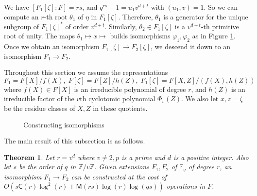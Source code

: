\documentclass[12pt]{article}
\theoremstyle{plain}
\newtheorem{theorem}{Theorem}
\theoremstyle{definition}
\def\Z{\ensuremath{\mathbb{Z}}}
\def\F{\ensuremath{\mathbb{F}}}
\def\MM{\ensuremath{\mathsf{M}}}
\def\CC{\ensuremath{\mathsf{C}}}
\begin{document}
We have $[F_1[\zeta]: F] = rs$, and $q^{rs} - 1 = u_1v^{d + t}$ with $(u_1, v) = 1$. So we can 
compute an $r$-th root $\theta_1$ of $\eta$ in $F_1[\zeta]$. Therefore, $\theta_1$ is a generator 
for the unique subgroup of $F_1[\zeta]^*$ of order $v^{d + t}$. Similarly, $\theta_2 \in 
F_1[\zeta]$ is a $v^{d + t}$-th primitive root of unity. The maps $\theta_1 \mapsto x \mapsto$ 
builds isomorphisms $\varphi_1, \varphi_2$ as in Figure \ref{figure:isom1}. Once we obtain an 
isomorphism $F_1[\zeta] \rightarrow F_2[\zeta]$, we descend it down to an isomorphism $F_1 
\rightarrow F_2$. 

Throughout this section we assume the representations
\begin{equation}
\label{equation:rep}
F_1 = F[X] / f(X), \; F[\zeta] = F[Z] / h(Z), \;
F_1[\zeta] = F[X, Z] / (f(X), h(Z))
\end{equation}
where $f(X) \in F[X]$ is an irreducible polynomial of degree $r$, and $h(Z)$ is an irreducible 
factor of the $v$th cyclotomic polynomial $\Phi_v(Z)$. We also let $x, z = \zeta$ be the residue 
classes of $X, Z$ in these quotients.
\begin{figure}[h]
	\begin{center}
		\caption{Constructing isomorphisms}
		\label{figure:isom1}
	\end{center}
\end{figure}

The main result of this subsection is as follows.
\begin{theorem}
	\label{theorem:isom-root}
	Let $r = v^d$ where $v \ne 2, p$ is a prime and $d$ is a positive integer. Also let $s$ be the 
	order of $q$ in $\Z / v\Z$. Given extensions $F_1, F_2$ of $\F_q$ of degree $r$, an isomorphism 
	$F_1 \rightarrow F_2$ can be constructed at the cost of $O(s\CC(r)\log^2(r) +  
	\MM(rs)\log(r)\log(qs))$ operations in $F$. 
\end{theorem}
\end{document}
